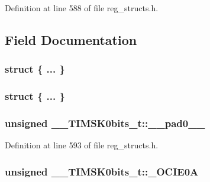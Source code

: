 Definition at line 588 of file reg\+\_\+structs.\+h.



\subsection{Field Documentation}
\hypertarget{union_____t_i_m_s_k0bits__t_a7d44dc92c13af8a93fbb221285a8b65c}{\subsubsection[{"@141}]{\setlength{\rightskip}{0pt plus 5cm}struct \{ ... \} }}\label{union_____t_i_m_s_k0bits__t_a7d44dc92c13af8a93fbb221285a8b65c}
\hypertarget{union_____t_i_m_s_k0bits__t_af058aebbef508b5d3453395a97f84bc3}{\subsubsection[{"@143}]{\setlength{\rightskip}{0pt plus 5cm}struct \{ ... \} }}\label{union_____t_i_m_s_k0bits__t_af058aebbef508b5d3453395a97f84bc3}
\hypertarget{union_____t_i_m_s_k0bits__t_add3d2200d86c2dcc9f267f32e1a6568e}{
\subsubsection[{\+\_\+\+\_\+pad0\+\_\+\+\_\+}]{\setlength{\rightskip}{0pt plus 5cm}unsigned \+\_\+\+\_\+\+T\+I\+M\+S\+K0bits\+\_\+t\+::\+\_\+\+\_\+pad0\+\_\+\+\_\+}}\label{union_____t_i_m_s_k0bits__t_add3d2200d86c2dcc9f267f32e1a6568e}


Definition at line 593 of file reg\+\_\+structs.\+h.

\hypertarget{union_____t_i_m_s_k0bits__t_a105935bb5c78017c8481ee347600511b}{
\subsubsection[{\+\_\+\+O\+C\+I\+E0\+A}]{\setlength{\rightskip}{0pt plus 5cm}unsigned \+\_\+\+\_\+\+T\+I\+M\+S\+K0bits\+\_\+t\+::\+\_\+\+O\+C\+I\+E0\+A}}\label{union_____t_i_m_s_k0bits__t_a105935bb5c78017c8481ee347600511b}



